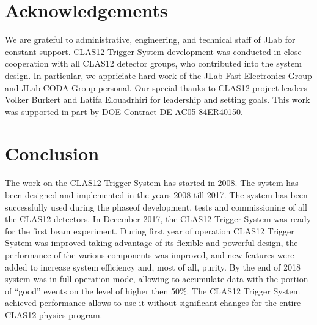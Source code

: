 \section{Acknowledgements}

We are grateful to administrative, engineering, and technical staff of JLab for constant support. CLAS12 Trigger System development was conducted in close cooperation with all CLAS12 detector groups, who contributed into the system design. In particular, we appriciate hard work of the JLab Fast Electronics Group and JLab CODA Group personal. Our special thanks to CLAS12 project leaders Volker Burkert and Latifa Elouadrhiri for leadership and setting goals. This work was supported in part by DOE Contract DE-AC05-84ER40150.

\section{Conclusion}

The work on the CLAS12 Trigger System has started in 2008. The system has been designed and implemented in the years 2008 till 2017. The system has been successfully used during the phaseof development, tests and commissioning of all the CLAS12 detectors. In December 2017, the CLAS12 Trigger System was ready for the first beam experiment. During first year of operation CLAS12 Trigger System was improved taking advantage of its flexible and powerful design, the performance of the various components was improved, and new features were added to increase system efficiency and, most of all, purity. By the end of 2018 system was in full operation mode, allowing to accumulate data with the portion of ``good'' events on the level of higher then 50$\%$. The CLAS12 Trigger System achieved performance allows to use it without significant changes for the entire CLAS12 physics program.

